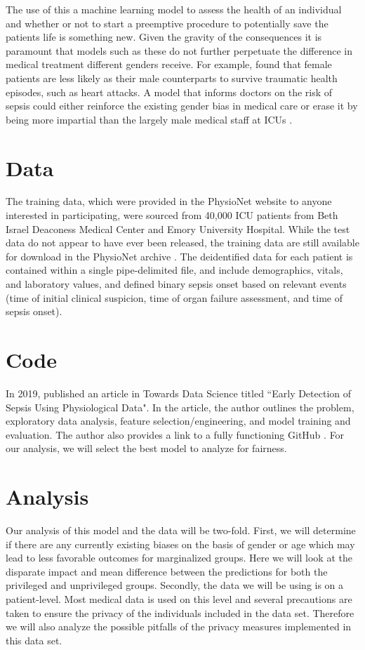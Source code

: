 \documentclass[10pt,letterpaper]{article}
\begin{document}
\par The use of this a machine learning model to assess the health of an individual and whether or not to start a preemptive procedure to potentially save the patients life is something new. Given the gravity of the consequences it is paramount that models such as these do not further perpetuate the difference in medical treatment different genders receive. For example, \citeauthor{Greenwood2018} found that female patients are less likely as their male counterparts to survive traumatic health episodes, such as heart attacks. A model that informs doctors on the risk of sepsis could either reinforce the existing gender bias in medical care or erase it by being more impartial than the largely male medical staff at ICUs \cite{Chadwick2020}.

\section*{Data}
\par The training data, which were provided in the PhysioNet website to anyone interested in participating, were sourced from 40,000 ICU patients from Beth Israel Deaconess Medical Center and Emory University Hospital. While the test data do not appear to have ever been released, the training data are still available for download in the PhysioNet archive \cite{Goldberger2000}. The deidentified data for each patient is contained within a single pipe-delimited file, and include demographics, vitals, and laboratory values, and defined binary sepsis onset based on relevant events (time of initial clinical suspicion, time of organ failure assessment, and time of sepsis onset).

\section*{Code}
\par In 2019, \citeauthor{Sindwani2019} published an article in Towards Data Science titled “Early Detection of Sepsis Using Physiological Data". In the article, the author outlines the problem, exploratory data analysis, feature selection/engineering, and model training and evaluation. The author also provides a link to a fully functioning GitHub \cite{Karan2019}. For our analysis, we will select the best model to analyze for fairness. 

\section*{Analysis}
\par Our analysis of this model and the data will be two-fold. First, we will determine if there are any currently existing biases on the basis of gender or age which may lead to less favorable outcomes for marginalized groups. Here we will look at the disparate impact and mean difference between the predictions for both the privileged and unprivileged groups. Secondly, the data we will be using is on a patient-level. Most medical data is used on this level and several precautions are taken to ensure the privacy of the individuals included in the data set. Therefore we will also analyze the possible pitfalls of the privacy measures implemented in this data set.

\newpage


\end{document}
